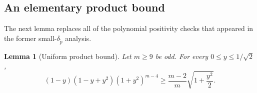﻿\documentclass[11pt]{article}
\newtheorem{lemma}[theorem]{Lemma}
\numberwithin{equation}{section}
\begin{document}
\subsection{An elementary product bound}

The next lemma replaces all of the polynomial positivity checks that appeared in the former small-$\delta_{\tilde p}$ analysis.

\begin{lemma}[Uniform product bound]\label{lem:plt23-product}
  Let $m\ge9$ be odd.
  For every $0\le y\le1/\sqrt2$,
  \begin{equation}\label{eq:plt23-product}
    (1-y)(1-y+y^2)(1+y^2)^{m-4}
    \ge
    \frac{m-2}{m}\sqrt{1+\frac{y^2}{2}}.
  \end{equation}
\end{lemma}
\end{document}
